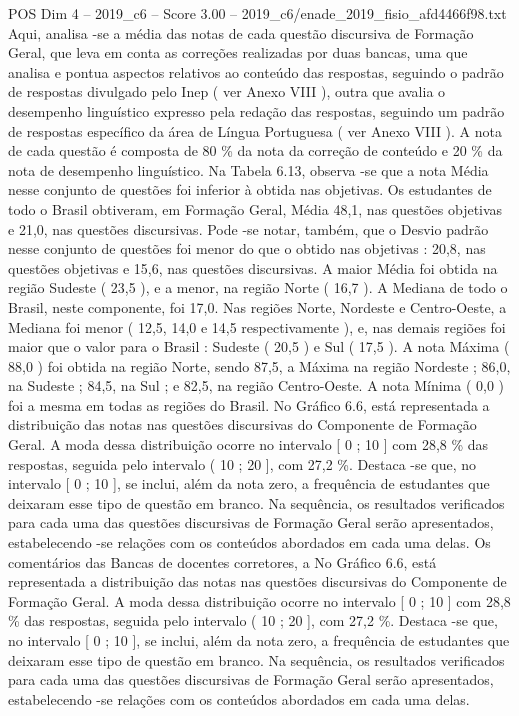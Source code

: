 \begin{textsample}{POS Dim 4 – 2019\_c6 – Score 3.00 – 2019\_c6/enade\_2019\_fisio\_afd4466f98.txt}
Aqui, analisa -se a média das notas de cada questão discursiva de Formação Geral, que leva em conta as correções realizadas por duas bancas, uma que analisa e pontua aspectos relativos ao conteúdo das respostas, seguindo o padrão de respostas divulgado pelo Inep ( ver Anexo VIII ), outra que avalia o desempenho linguístico expresso pela redação das respostas, seguindo um padrão de respostas específico da área de Língua Portuguesa ( ver Anexo VIII ).
A nota de cada questão é composta de 80 \% da nota da correção de conteúdo e 20 \% da nota de desempenho linguístico.
Na Tabela 6.13, observa -se que a nota Média nesse conjunto de questões foi inferior à obtida nas objetivas.
Os estudantes de todo o Brasil obtiveram, em Formação Geral, Média 48,1, nas questões objetivas e 21,0, nas questões discursivas.
Pode -se notar, também, que o Desvio padrão nesse conjunto de questões foi menor do que o obtido nas objetivas : 20,8, nas questões objetivas e 15,6, nas questões discursivas.
A maior Média foi obtida na região Sudeste ( 23,5 ), e a menor, na região Norte ( 16,7 ).
A Mediana de todo o Brasil, neste componente, foi 17,0.
Nas regiões Norte, Nordeste e Centro-Oeste, a Mediana foi menor ( 12,5, 14,0 e 14,5 respectivamente ), e, nas demais regiões foi maior que o valor para o Brasil : Sudeste ( 20,5 ) e Sul ( 17,5 ).
A nota Máxima ( 88,0 ) foi obtida na região Norte, sendo 87,5, a Máxima na região Nordeste ; 86,0, na Sudeste ; 84,5, na Sul ; e 82,5, na região Centro-Oeste.
A nota Mínima ( 0,0 ) foi a mesma em todas as regiões do Brasil.
No Gráfico 6.6, está representada a distribuição das notas nas questões discursivas do Componente de Formação Geral.
A moda dessa distribuição ocorre no intervalo [ 0 ; 10 ] com 28,8 \% das respostas, seguida pelo intervalo ( 10 ; 20 ], com 27,2 \%.
Destaca -se que, no intervalo [ 0 ; 10 ], se inclui, além da nota zero, a frequência de estudantes que deixaram esse tipo de questão em branco.
Na sequência, os resultados verificados para cada uma das questões discursivas de Formação Geral serão apresentados, estabelecendo -se relações com os conteúdos abordados em cada uma delas.
Os comentários das Bancas de docentes corretores, a No Gráfico 6.6, está representada a distribuição das notas nas questões discursivas do Componente de Formação Geral.
A moda dessa distribuição ocorre no intervalo [ 0 ; 10 ] com 28,8 \% das respostas, seguida pelo intervalo ( 10 ; 20 ], com 27,2 \%.
Destaca -se que, no intervalo [ 0 ; 10 ], se inclui, além da nota zero, a frequência de estudantes que deixaram esse tipo de questão em branco.
Na sequência, os resultados verificados para cada uma das questões discursivas de Formação Geral serão apresentados, estabelecendo -se relações com os conteúdos abordados em cada uma delas.

\end{textsample}
